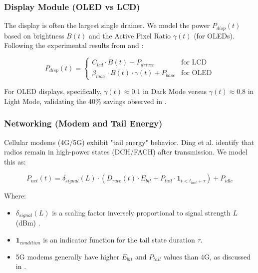 \documentclass[12pt]{article}
\begin{document}
\subsubsection{Display Module (OLED vs LCD)}

The display is often the largest single drainer. We model the power $P_{disp}(t)$ based on brightness $B(t)$ and the Active Pixel Ratio $\gamma(t)$ (for OLEDs). Following the experimental results from \cite{2} and \cite{5}:

\begin{equation} \label{eq:display_power}
P_{disp}(t) = \begin{cases} 
C_{lcd} \cdot B(t) + P_{driver} & \text{for LCD} \\
\beta_{max} \cdot B(t) \cdot \gamma(t) + P_{base} & \text{for OLED}
\end{cases}
\end{equation}

For OLED displays, specifically, $\gamma(t) \approx 0.1$ in Dark Mode versus $\gamma(t) \approx 0.8$ in Light Mode, validating the 40\% savings observed in \cite{5}.

\subsubsection{Networking (Modem and Tail Energy)}

Cellular modems (4G/5G) exhibit "tail energy" behavior. Ding et al. \cite{13} identify that radios remain in high-power states (DCH/FACH) after transmission. We model this as:

\begin{equation} \label{eq:network_power}
P_{net}(t) = \delta_{signal}(L) \cdot \left( D_{rate}(t) \cdot E_{bit} + P_{tail} \cdot \mathbf{1}_{t < t_{last} + \tau} \right) + P_{idle}
\end{equation}

Where:
\begin{itemize}
    \item $\delta_{signal}(L)$ is a scaling factor inversely proportional to signal strength $L$ (dBm) \cite{13}.
    \item $\mathbf{1}_{condition}$ is an indicator function for the tail state duration $\tau$.
    \item 5G modems generally have higher $E_{bit}$ and $P_{tail}$ values than 4G, as discussed in \cite{3}.
\end{itemize}

\newpage
\end{document}
